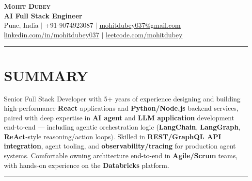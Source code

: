 \documentclass[100pt,a4paper]{article}
\newcommand{\sectionline}{
\begin{center}
\vspace{-10pt}
\rule{1\textwidth}{0.5pt}
\end{center}
\vspace{1pt}
}
\begin{document}
\begin{center}
    \textbf{\Huge \scshape Mohit Dubey} \\ \vspace{4pt}
    \textbf{AI Full Stack Engineer } \\ \vspace{6pt}
    \small Pune, India $|$ +91-9074923087 $|$ \href{mailto:mohitdubey037@gmail.com}{\underline{mohitdubey037@gmail.com}} \\
    \href{https://www.linkedin.com/in/mohit-dubey-037/}{\underline{linkedin.com/in/mohitdubey037}} $|$ \href{https://leetcode.com/u/mohitdubey037/}
    {\underline{leetcode.com/mohitdubey}}
\end{center}


\sectionline
\section*{SUMMARY}
Senior Full Stack Developer with 5+ years of experience designing and building high-performance \textbf{React} applications and \textbf{Python/Node.js} backend services, paired with deep expertise in \textbf{AI agent} and \textbf{LLM application} development end-to-end — including agentic orchestration logic (\textbf{LangChain}, \textbf{LangGraph}, \textbf{ReAct}-style reasoning/action loops). Skilled in \textbf{REST/GraphQL API integration}, agent tooling, and \textbf{observability/tracing} for production agent systems. Comfortable owning architecture end-to-end in \textbf{Agile/Scrum} teams, with hands-on experience on the \textbf{Databricks} platform.


\sectionline
\end{document}

